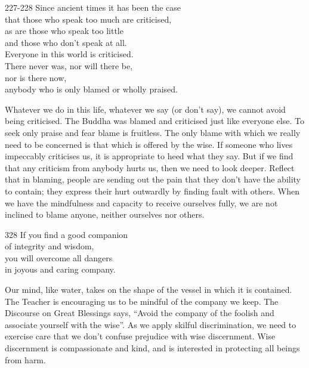 
\begin{dhpVerse}{227-228}
\label{dhp-227}\label{dhp-228}
Since ancient times it has been the case\\
that those who speak too much are criticised,\\
as are those who speak too little\\
and those who don't speak at all.\\
Everyone in this world is criticised.\\
There never was, nor will there be,\\
nor is there now,\\
anybody who is only blamed or wholly praised.
\end{dhpVerse}

\begin{dhpRefl}

Whatever we do in this life, whatever we say (or don't say), we
cannot avoid being criticised. The Buddha was blamed and criticised
just like everyone else. To seek only praise and fear blame is
fruitless. The only blame with which we really need to be concerned
is that which is offered by the wise. If someone who lives impeccably
criticises us, it is appropriate to heed what they say. But if we
find that any criticism from anybody hurts us, then we need to look
deeper. Reflect that in blaming, people are sending out the pain that
they don't have the ability to contain; they express their hurt
outwardly by finding fault with others. When we have the mindfulness
and capacity to receive ourselves fully, we are not inclined to blame
anyone, neither ourselves nor others.

\end{dhpRefl}


\begin{dhpVerse}{328}
\label{dhp-328}
If you find a good companion\\
of integrity and wisdom,\\
you will overcome all dangers\\
in joyous and caring company.
\end{dhpVerse}

\begin{dhpRefl}

Our mind, like water, takes on the shape of the vessel in which it is
contained. The Teacher is encouraging us to be mindful of the company
we keep. The Discourse on Great Blessings says, ``Avoid the company
of the foolish and associate yourself with the wise''. As we apply
skilful discrimination, we need to exercise care that we don't
confuse prejudice with wise discernment. Wise discernment is
compassionate and kind, and is interested in protecting all beings
from harm.

\end{dhpRefl}

